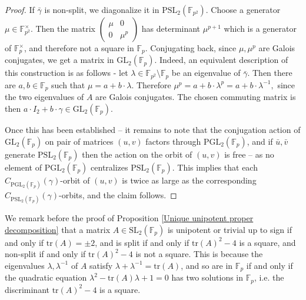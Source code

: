 \documentclass[letterpaper]{amsart}
\begin{document}
\begin{proof}
If $\bar{\gamma}$ is non-split, we diagonalize it in $\mathrm{PSL}_2(\mathbb{F}_{p^2}).$ Choose a generator $\mu \in \mathbb{F}_{p^2}^\times$. Then the matrix $\begin{pmatrix} \mu & 0 \\ 0 & \mu^p \end{pmatrix}$ has determinant $\mu^{p + 1}$ which is a generator of $\mathbb{F}_p^\times$, and therefore not a square in $\mathbb{F}_p$. Conjugating back, since $\mu, \mu^p$ are Galois conjugates, we get a matrix in $\mathrm{GL}_2(\mathbb{F}_p)$. Indeed, an equivalent description of this construction is as follows - let $\lambda \in \mathbb{F}_{p^2} \setminus \mathbb{F}_p$ be an eigenvalue of $\bar{\gamma}.$ Then there are $a, b \in \mathbb{F}_p$ such that $\mu = a + b \cdot \lambda$. Therefore $\mu^p = a + b \cdot \lambda^p = a + b \cdot \lambda^{-1},$ since the two eigenvalues of $A$ are Galois conjugates. The chosen commuting matrix is then $a \cdot I_2 + b \cdot \gamma \in \mathrm{GL}_2(\mathbb{F}_p)$.

Once this has been established -- it remains to note that the conjugation action of $\mathrm{GL}_2(\mathbb{F}_p)$ on pair of matrices $(u, v)$ factors through $\mathrm{PGL}_2(\mathbb{F}_p)$, and if $\bar{u}, \bar{v}$ generate $\mathrm{PSL}_2(\mathbb{F}_p)$ then the action on the orbit of $(u, v)$ is free -- as no element of $\mathrm{PGL}_2(\mathbb{F}_p)$ centralizes $\mathrm{PSL}_2(\mathbb{F}_p).$ This implies that each $C_{\mathrm{PGL}_2(\mathbb{F}_p)}(\gamma)$-orbit of $(u, v)$ is twice as large as the corresponding $C_{\mathrm{PSL}_2(\mathbb{F}_p)}(\gamma)$-orbits, and the claim follows.
\end{proof}
We remark before the proof of Proposition \ref{Unique unipotent proper decomposition} that a matrix $A \in \mathrm{SL}_2(\mathbb{F}_p)$ is unipotent or trivial up to sign if and only if $\mathrm{tr}(A) = \pm 2$, and is split if and only if $\mathrm{tr}(A)^2 - 4$ is a square, and non-split if and only if $\mathrm{tr}(A)^2 - 4$ is not a square. This is because the eigenvalues $\lambda,\lambda^{-1}$ of $A$ satisfy $\lambda + \lambda^{-1} = \mathrm{tr}(A)$, and so are in $\mathbb{F}_p$ if and only if the quadratic equation $\lambda^2 - \mathrm{tr}(A)\lambda + 1 = 0$ has two solutions in $\mathbb{F}_p$, i.e. the discriminant $\mathrm{tr}(A)^2 - 4$ is a square.
\end{document}
